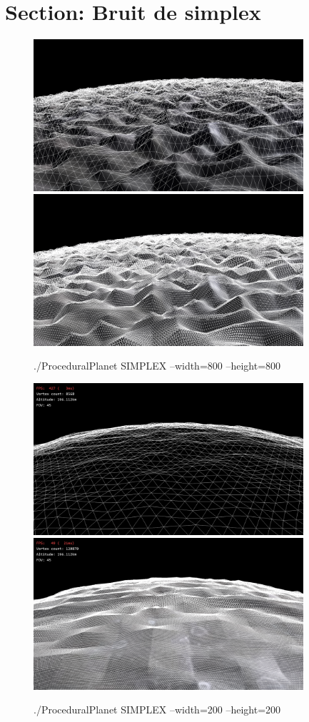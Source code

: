 \section*{Section: Bruit de simplex}

\begin{center}

\begin{figure}[H]
    \centering
    \includegraphics[width=10cm]{img/SIMPLEX_w800_h800_wire_0.png}
    \includegraphics[width=10cm]{img/SIMPLEX_w800_h800_wire_1.png}
    \caption{./ProceduralPlanet SIMPLEX --width=800 --height=800}
    \label{fig:simplex_800}
\end{figure}


\begin{figure}[H]
    \centering
    \includegraphics[width=10cm]{img/SIMPLEX_w200_h200_wire_0.png}
    \includegraphics[width=10cm]{img/SIMPLEX_w200_h200_wire_1.png}
    \caption{./ProceduralPlanet SIMPLEX --width=200 --height=200}
    \label{fig:simplex_200}
\end{figure}

\end{center} 

\newpage